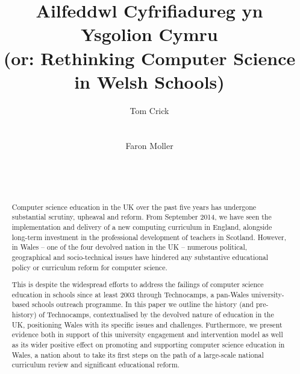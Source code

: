 \documentclass{sig-alternate}
\begin{document}
%

\title{Ailfeddwl Cyfrifiadureg yn Ysgolion Cymru\\(or: Rethinking Computer Science in Welsh Schools)}

 \author{
 \alignauthor
 Tom Crick\\
 \\
 \\
 \alignauthor
 Faron Moller\\
 \\
 \\
 \\
 }

\maketitle

\begin{abstract}
Computer science education in the UK over the past five years has
undergone substantial scrutiny, upheaval and reform. From September
2014, we have seen the implementation and delivery of a new computing
curriculum in England, alongside long-term investment in the
professional development of teachers in Scotland. However, in Wales --
one of the four devolved nation in the UK -- numerous political,
geographical and socio-technical issues have hindered any substantive
educational policy or curriculum reform for computer science.

This is despite the widespread efforts to address the failings of
computer science education in schools since at least 2003 through
Technocamps, a pan-Wales university-based schools outreach
programme. In this paper we outline the history (and pre-history) of
Technocamps, contextualised by the devolved nature of education in the
UK, positioning Wales with its specific issues and
challenges. Furthermore, we present evidence both in support of this
university engagement and intervention model as well as its wider
positive effect on promoting and supporting computer science education
in Wales, a nation about to take its first steps on the path of a
large-scale national curriculum review and significant educational
reform.
\end{abstract}
\end{document}
